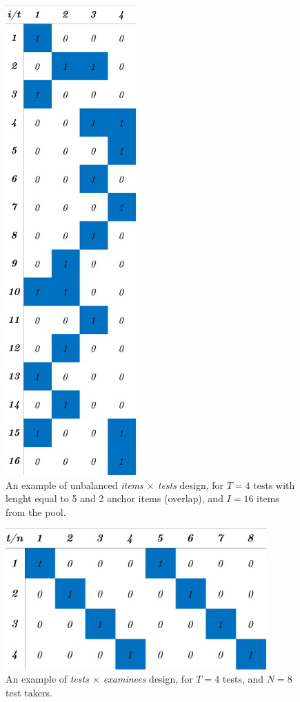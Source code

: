 \begin{figure}[H] 
	\centering
	\includegraphics[width=5cm]{Figures/itemsxtests.png}
	\caption{An example of unbalanced \emph{items $\times$ tests} design, for $T=4$ tests with lenght equal to 5 and 2 anchor items (overlap), and $I=16$ items from the pool.}
	\label{fig:itemsxtests}
\end{figure}
\pagebreak

\begin{figure}[H] 
	\centering
	\includegraphics[width=10cm]{Figures/testsxexaminees.png}
	\caption{An example of \emph{tests $\times$ examinees} design, for $T=4$ tests, and $N=8$ test takers. }
	\label{fig:testsxexaminees}
\end{figure}
\pagebreak

